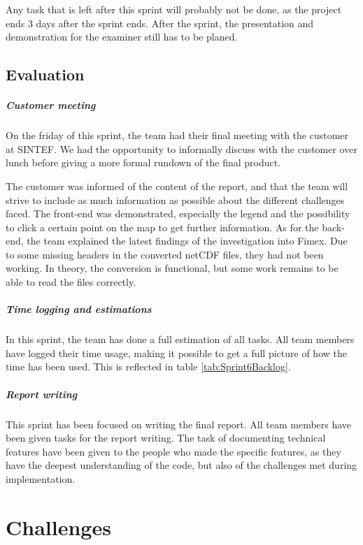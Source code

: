 \documentclass[11pt,a4paper,titlepage,oneside]{report}
\begin{document}
Any task that is left after this sprint will probably not be done, as the project ends 3 days after the sprint ends. After the sprint, the presentation and demonstration for the examiner still has to be planed. 

\section{Evaluation}
\paragraph{Customer meeting}
On the friday of this sprint, the team had their final meeting with the customer at SINTEF. We had the opportunity to informally discuss with the customer over lunch before giving a more formal rundown of the final product. 

The customer was informed of the content of the report, and that the team will strive to include as much information as possible about the different challenges faced. The \gls{front-end} was demonstrated, especially the legend and the possibility to click a certain point on the map to get further information. As for the \gls{back-end}, the team explained the latest findings of the investigation into \gls{Fimex}. Due to some missing headers in the converted netCDF files, they had not been working. In theory, the conversion is functional, but some work remains to be able to read the files correctly.

\paragraph{Time logging and estimations}
In this sprint, the team has done a full estimation of all tasks. All team members have logged their time usage, making it possible to get a full picture of how the time has been used. This is reflected in table \ref{tab:Sprint6Backlog}.

\paragraph{Report writing}
This sprint has been focused on writing the final report. All team members have been given tasks for the report writing. The task of documenting technical features have been given to the people who made the specific features, as they have the deepest understanding of the code, but also of the challenges met during implementation. 

\chapter{Challenges}
\label{chap:Challenges}
\end{document}
